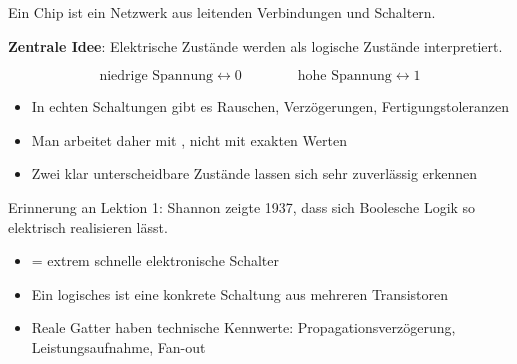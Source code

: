 \renewcommand{\thelektion}{L08 \textperiodcentered{} Logische Gatter I}
\usetikzlibrary{circuits.logic.US}
\graphicspath{{./Grundlagen_Info/16_ComputerUndKodierungen/Slides/assets}}

\begin{frame}\end{frame}

\begin{frame}
\begin{center}
Ein Chip ist ein Netzwerk aus leitenden Verbindungen und Schaltern.
\vspace{4mm}

\textbf{Zentrale Idee}: Elektrische Zustände werden als logische Zustände interpretiert.
\end{center}
\begin{figure}[H]
    \centering
    
    \[
    \text{niedrige Spannung} \longleftrightarrow 0
    \qquad
    \qquad
    \text{hohe Spannung} \longleftrightarrow 1
\]
\end{figure}
\end{frame}

\begin{frame}
\begin{itemize}[<+->]\setlength\itemsep{7pt}
  \item In echten Schaltungen gibt es Rauschen, Verzögerungen, Fertigungstoleranzen
  \item Man arbeitet daher mit , nicht mit exakten Werten
  \item Zwei klar unterscheidbare Zustände lassen sich sehr zuverlässig erkennen
\end{itemize}
\vspace{3mm}
\begin{center}
Erinnerung an Lektion 1: Shannon zeigte 1937, dass sich Boolesche Logik so elektrisch realisieren lässt.
\end{center}
\end{frame}

\begin{frame}
\begin{itemize}[<+->]\setlength\itemsep{7pt}
  \item {} = extrem schnelle elektronische Schalter
  \item Ein logisches  ist eine konkrete Schaltung aus mehreren Transistoren
  \item Reale Gatter haben technische Kennwerte: Propagationsverzögerung, Leistungsaufnahme, Fan-out
\end{itemize}
\end{frame}

